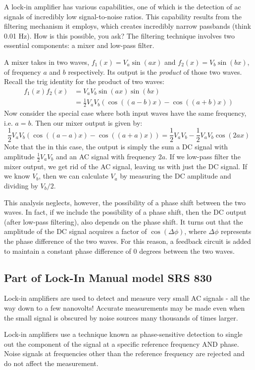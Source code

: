 \documentclass{../lab}
\begin{document}
A lock-in amplifier has various capabilities, one of which is the detection of ac signals of incredibly low signal-to-noise ratios. This capability results from the filtering mechanism it employs, which creates incredibly narrow passbands (think 0.01 Hz). How is this possible, you ask? The filtering technique involves two essential components: a mixer and low-pass filter.

A mixer takes in two waves, $f_1(x) = V_a\sin(ax)$ and $f_2(x) = V_b\sin(bx)$, of frequency $a$ and $b$ respectively. Its output is the \emph{product} of those two waves. Recall the trig identity for the product of two waves:
\begin{align*}
f_1(x) f_2(x) &= V_a V_b \sin(ax)\sin(bx) \\
&= \frac{1}{2} V_a V_b(\cos((a-b)x) - \cos((a+b)x))
\end{align*}
Now consider the special case where both input waves have the same frequency, i.e. $a = b$. Then our mixer output is given by:
\[
\frac{1}{2} V_a V_b(\cos((a-a)x) - \cos((a+a)x))
    = \frac{1}{2}V_a V_b - \frac{1}{2} V_a V_b \cos(2ax)
\]
Note that the in this case, the output is simply the sum a DC signal with amplitude $\frac{1}{2} V_a V_b$ and an AC signal with frequency $2a$. If we low-pass filter the mixer output, we get rid of the AC signal, leaving us with just the DC signal. If we know $V_b$, then we can calculate $V_a$ by measuring the DC amplitude and dividing by $V_b/2$.

This analysis neglects, however, the possibility of a phase shift between the two waves. In fact, if we include the possibility of a phase shift, then the DC output (after low-pass filtering), also depends on the phase shift. It turns out that the amplitude of the DC signal acquires a factor of $\cos(\Delta \phi)$, where $\Delta \phi$ represents the phase difference of the two waves. For this reason, a feedback circuit is added to maintain a constant phase difference of 0 degrees between the two waves.

\subsection{Part of Lock-In Manual model SRS 830}

Lock-in amplifiers are used to detect and measure very small AC signals - all the way down to a few nanovolts! Accurate measurements may be made even when the small signal is obscured by noise sources many thousands of times larger.

Lock-in amplifiers use a technique known as phase-sensitive detection to single out the component of the signal at a specific reference frequency AND phase. Noise signals at frequencies other than the reference frequency are rejected and do not affect the measurement.
\end{document}
